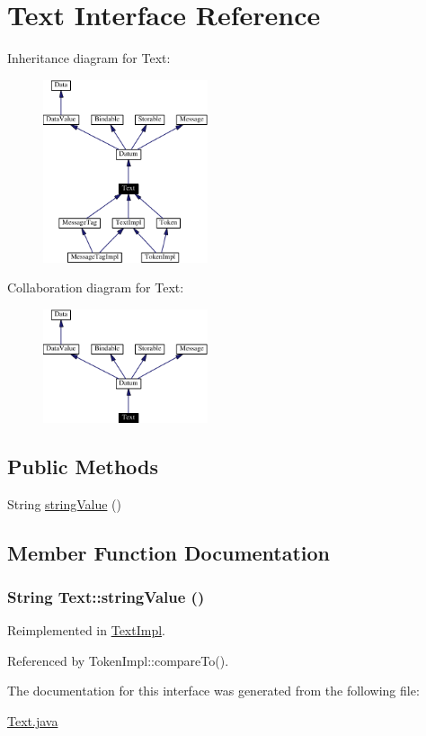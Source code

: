\hypertarget{interfaceText}{
\section{Text  Interface Reference}
\label{interfaceText}
}
Inheritance diagram for Text:\begin{figure}[H]
\begin{center}
\leavevmode
\includegraphics[width=137pt]{interfaceText__inherit__graph}
\end{center}
\end{figure}
Collaboration diagram for Text:\begin{figure}[H]
\begin{center}
\leavevmode
\includegraphics[width=137pt]{interfaceText__coll__graph}
\end{center}
\end{figure}
\subsection*{Public Methods}
\begin{CompactItemize}
\item 
String \hyperlink{interfaceText_a0}{string\-Value} ()
\end{CompactItemize}


\subsection{Member Function Documentation}
\hypertarget{interfaceText_a0}{
\subsubsection[stringValue]{\setlength{\rightskip}{0pt plus 5cm}String Text::string\-Value ()}}
\label{interfaceText_a0}




Reimplemented in \hyperlink{classTextImpl_a0}{Text\-Impl}.

Referenced by Token\-Impl::compare\-To().



The documentation for this interface was generated from the following file:\begin{CompactItemize}
\item 
\hyperlink{Text_8java-source}{Text.java}\end{CompactItemize}
